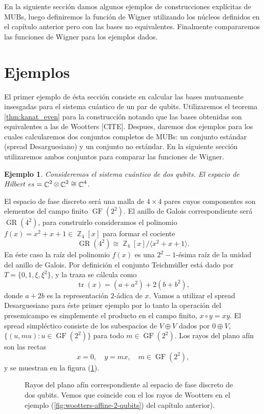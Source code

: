 \documentclass[a4paper]{report}
\DeclareMathOperator{\C}{\mathbb{C}}
\DeclareMathOperator{\Z}{\mathbb{Z}}
\let\H\relax
\DeclareMathOperator{\H}{\mathcal H}
\DeclareMathOperator{\tr}{tr}
\DeclareMathOperator{\GF}{GF}
\DeclareMathOperator{\GR}{GR}
\newtheorem{example}{Ejemplo}
\begin{document}
  En la siguiente sección damos algunos ejemplos de
  construcciones explícitas de MUBs, luego definiremos la
  función de Wigner utilizando los núcleos definidos en el
  capítulo anterior pero con las bases no equivalentes.
  Finalmente compararemos las funciones de Wigner para los
  ejemplos dados.

  \section{Ejemplos}

  El primer ejemplo de ésta sección consiste en calcular las
  bases mutuamente insesgadas para el sistema cuántico de un
  par de qubits. Utilizaremos el teorema
  \ref{thm:kanat_even} para la construcción notando que las
  bases obtenidas son equivalentes a las de Wootters [CITE].
  Despues, daremos dos ejemplos para los cuales calcularemos
  dos conjuntos completos de MUBs: un conjunto estándar
  (spread Desarguesiano) y un conjunto no estándar. En la
  siguiente sección utilizaremos ambos conjuntos para
  comparar las funciones de Wigner.

  \begin{example}
    Consideremos el sistema cuántico de dos qubits. El
    espacio de Hilbert es $\H = \C^2 \otimes \C^2 \cong
    \C^{4}$. 
  \end{example}
  El espacio de fase discreto será una malla de
  $4 \times 4$ pares cuyos componentes son elementos del
  campo finito $\GF(2^2)$. El anillo de Galois
  correspondiente será $\GR(4^{2})$, para construirlo
  consideramos el polinomio $f(x) = x^2+x+1 \in \Z_4[x]$
  para formar el cociente
  \[
    \GR(4^2) \cong \Z_4[x] / \langle x^2+x+1 \rangle.
  \] 
  En éste caso la raíz del polinomio $f(x)$ es una
  $2^{2}-1$-ésima raíz de la unidad del anillo de Galois.
  Por definición el conjunto Teichmüller está dado por $T =
  \{0,1,\xi,\xi^2\}$, y la traza se cálcula como
  \[
    \tr(x) = (a + a^2) + 2(b + b^2),
  \] 
  donde $a + 2b$ es la representación $2$-ádica de $x$.
  Vamos a utilizar el spread Desarguesiano para éste primer
  ejemplo por lo tanto la operación del presemicampo es
  simplemente el producto en el campo finito, $x \circ y =
  xy$. El spread simpléctico consiste de los subespacios de
  $V \oplus V$ dados por $0 \oplus V$, $\{(u, mu) : u \in
  \GF(2^2)\}$ para todo $m \in \GF(2^2)$.  Los rayos del
  plano afín son las rectas
  \[
    x = 0,
    \quad
    y = mx, \quad m \in \GF(2^2),
  \] 
  y se muestran en la figura (\ref{fig:2-2-desargues-plane}).
  \begin{figure}[ht]
    \centering
    \scalebox{0.8}{
      
    }
    \caption{Rayos del plano afín correspondiente al espacio
    de fase discreto de dos qubits. Vemos que coincide con
    el los rayos de Wootters en el ejemplo
    (\ref{fig:wootters-affine-2-qubits}) del capítulo
    anterior).}
    \label{fig:2-2-desargues-plane}
  \end{figure}
\end{document}
